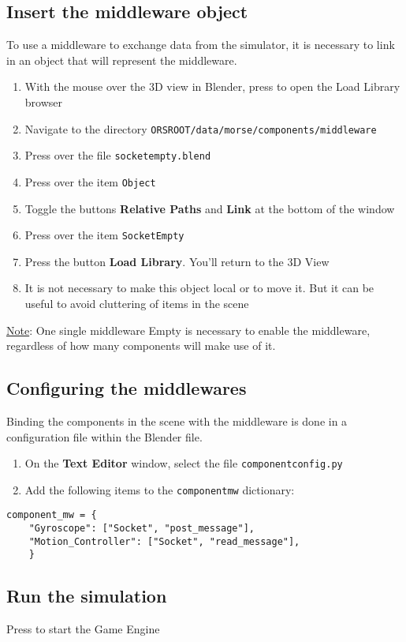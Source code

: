 \documentclass[twoside,a4paper,10pt]{report}
\newcommand{\dokutitleleveltree}[1]{\subsection{#1}}
\newcommand{\dokubold}[1]{\textbf{#1}}
\newcommand{\dokumonospace}[1]{\texttt{#1}}
\newcommand{\dokuunderline}[1]{\underline{#1}}
\newcommand{\dokuitem}{\item}
\begin{document}
\dokutitleleveltree{Insert the middleware object}
\label{fc2213e90f6f9853c66c14f9f79c3379}%
To use a middleware to exchange data from the simulator, it is necessary to link in an object that will represent the middleware.



\begin{enumerate}\dokuitem  With the mouse over the 3D view in Blender, press  to open the Load Library browser
\dokuitem  Navigate to the directory \dokumonospace{{\textdollar}ORS{\textunderscore}ROOT/data/morse/components/middleware}
\dokuitem  Press  over the file \dokumonospace{socket{\textunderscore}empty.blend}
\dokuitem  Press  over the item \dokumonospace{Object}
\dokuitem  Toggle the buttons \dokubold{Relative Paths} and \dokubold{Link} at the bottom of the window
\dokuitem  Press  over the item \dokumonospace{Socket{\textunderscore}Empty}
\dokuitem  Press the button \dokubold{Load Library}. You'll return to the 3D View
\dokuitem  It is not necessary to make this object local or to move it. But it can be useful to avoid cluttering of items in the scene
\end{enumerate}

\dokuunderline{Note}: One single middleware Empty is necessary to enable the middleware, regardless of how many components will make use of it.


\dokutitleleveltree{Configuring the middlewares}
\label{7c1b9786b6402b908e3042548cd3c1c6}%
Binding the components in the scene with the middleware is done in a configuration file within the Blender file.



\begin{enumerate}\dokuitem  On the \dokubold{Text Editor} window, select the file \dokumonospace{component{\textunderscore}config.py}
\dokuitem  Add the following items to the \dokumonospace{component{\textunderscore}mw} dictionary:
\end{enumerate}

\lstset{language=python}
\begin{lstlisting}
component_mw = {
    "Gyroscope": ["Socket", "post_message"],
    "Motion_Controller": ["Socket", "read_message"],
	}

\end{lstlisting}

\dokutitleleveltree{Run the simulation}
\label{62874528899bc63c891e142b192d89b7}%
Press  to start the Game Engine
\end{document}
